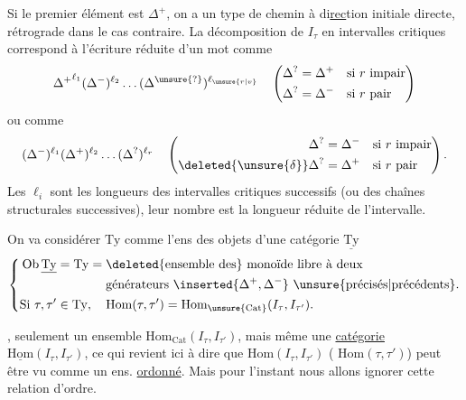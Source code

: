 Si le premier élément est $\Delta^+$, on a un  type de chemin à di\uline{rec}tion initiale directe, rétrograde dans le cas contraire. La décomposition de $I_\tau$  en intervalles critiques correspond à l'écriture réduite d'un mot comme
\[ {\Delta^+}^{\ell_1}(\Delta^-)^{\ell_2}\ldots(\Delta^{\unsure{?}})^{\ell_{\unsure{r|v}}}
\quad\left(\begin{aligned}\Delta^{?}&=\Delta^+&&\text{si }r\text{ impair}\\\Delta^{?}&=\Delta^-&&\text{si }r\text{ pair}\end{aligned}\right) \]
ou comme
\[ (\Delta^-)^{\ell_1}(\Delta^+)^{\ell_2}\ldots(\Delta^{?})^{\ell_r}
\quad\left(\begin{aligned}\Delta^{?}&=\Delta^-&&\text{si }r\text{ impair}\\
\deleted{\unsure{\delta}}\Delta^{?}&=\Delta^+&&\text{si }r\text{ pair}\end{aligned}\right). \]
Les $\ell_i$ sont les longueurs des intervalles critiques successifs (ou des chaînes structurales successives), leur nombre est la longueur réduite de l'intervalle.

On va considérer $\mathrm{Ty}$ comme l'ens des objets d'une catégorie $\underline{\mathrm{Ty}}$
\[ \left\{\begin{aligned}
\mathrm{Ob}\,\underline{\mathrm{Ty}}&=\mathrm{Ty}=\begin{aligned}[t]
&\text{\deleted{ensemble des} monoïde libre à deux}\\
&\text{générateurs }\inserted{\Delta^+,\Delta^-}\ \text{\unsure{précisés|précédents}.}
\end{aligned}\\
\text{Si }\tau,\tau'&\in\mathrm{Ty},\quad \mathrm{Hom}(\tau,\tau')=\mathrm{Hom}_{\unsure{\mathrm{Cat}}}(I_\tau,I_{\tau'}).
\end{aligned}\right. \]

,  seulement un ensemble $\mathrm{Hom}_{\mathrm{Cat}}(I_\tau,I_{\tau'})$, mais même une \uline{catégorie} $\underline{\mathrm{Hom}}(I_\tau,I_{\tau'})$, ce qui revient ici à dire que $\mathrm{Hom}(I_\tau,I_{\tau'})$ ( $\mathrm{Hom}(\tau,\tau')$) peut être vu comme un ens. \uline{ordonné}. Mais pour l'instant nous allons ignorer cette relation d'ordre.

